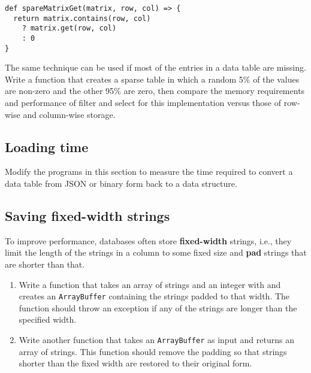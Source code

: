 \documentclass[krantzl]{krantz}
\newcommand{\glossref}[1]{\textbf{#1}}
\begin{document}
\begin{lstlisting}[frame=single,frameround=tttt]
def spareMatrixGet(matrix, row, col) => {
  return matrix.contains(row, col)
    ? matrix.get(row, col)
    : 0
}
\end{lstlisting}


The same technique can be used if most of the entries in a data table are missing.
Write a function that creates a sparse table in which a random 5\% of the values are non-zero
and the other 95\% are zero,
then compare the memory requirements and performance of filter and select for this implementation
versus those of row-wise and column-wise storage.

\subsection*{Loading time}


Modify the programs in this section to measure the time required to convert a data table from JSON or binary form
back to a data structure.

\subsection*{Saving fixed-width strings}


To improve performance,
databases often store \glossref{fixed-width} strings,
i.e.,
they limit the length of the strings in a column to some fixed size
and \glossref{pad} strings that are shorter than that.

\begin{enumerate}

\item 

Write a function that takes an array of strings and an integer with
    and creates an \texttt{ArrayBuffer} containing the strings padded to that width.
    The function should throw an exception if any of the strings
    are longer than the specified width.



\item 

Write another function that takes an \texttt{ArrayBuffer} as input
    and returns an array of strings.
    This function should remove the padding
    so that strings shorter than the fixed width are restored to their original form.



\end{enumerate}
\end{document}
